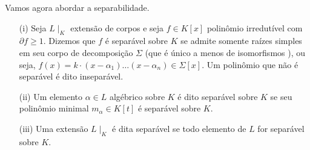 Vamos agora abordar a separabilidade.
\begin{defn}\begin{itemize}
\item[(i)] Seja $L\mid_K$ extensão de corpos e seja $f\in K[x]$ polinômio irredutível com $\partial f \ge 1$. Dizemos que $f$ é separável sobre $K$ se admite somente raízes simples em seu corpo de decomposição $\Sigma$ (que é único a menos de isomorfismos \cite{stewart}), ou seja, $f(x)=k\cdot (x-\alpha_1)\dots (x-\alpha_n) \in \Sigma[x]$. Um polinômio que não é separável é dito inseparável. 
\item[(ii)] Um elemento $\alpha\in L$ algébrico sobre $K$ é dito separável sobre $K$ se seu polinômio minimal $m_\alpha \in K[t]$ é separável sobre $K$. 
\item[(iii)] Uma extensão $L\mid_K$ é dita separável se todo elemento de $L$ for separável sobre $K$.\end{itemize}
\end{defn} \par

